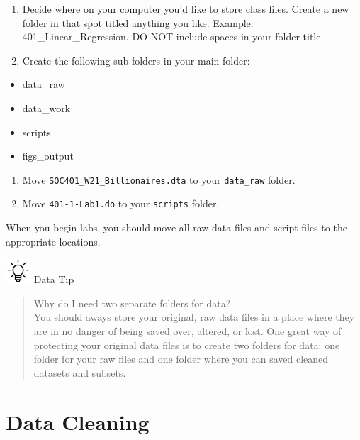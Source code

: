 \documentclass[
]{book}
\providecommand{\tightlist}{%
  \setlength{\itemsep}{0pt}\setlength{\parskip}{0pt}}
\begin{document}
\begin{enumerate}
\def\labelenumi{\arabic{enumi}.}
\tightlist
\item
  Decide where on your computer you'd like to store class files. Create a new folder in that spot titled anything you like. Example: 401\_Linear\_Regression. DO NOT include spaces in your folder title.
\item
  Create the following sub-folders in your main folder:
\end{enumerate}

\begin{itemize}
\tightlist
\item
  data\_raw
\item
  data\_work
\item
  scripts
\item
  figs\_output
\end{itemize}

\begin{enumerate}
\def\labelenumi{\arabic{enumi}.}
\setcounter{enumi}{2}
\tightlist
\item
  Move \texttt{SOC401\_W21\_Billionaires.dta} to your \texttt{data\_raw} folder.
\item
  Move \texttt{401-1-Lab1.do} to your \texttt{scripts} folder.
\end{enumerate}

When you begin labs, you should move all raw data files and script files to the appropriate locations.

\includegraphics[width=0.36458in,height=\textheight]{images/bulb.png} Data Tip

\begin{quote}
Why do I need two separate folders for data?\\
You should aways store your original, raw data files in a place where they are in no danger of being saved over, altered, or lost. One great way of protecting your original data files is to create two folders for data: one folder for your raw files and one folder where you can saved cleaned datasets and subsets.
\end{quote}

\hypertarget{data-cleaning}{%
\section{Data Cleaning}\label{data-cleaning}}
\end{document}
